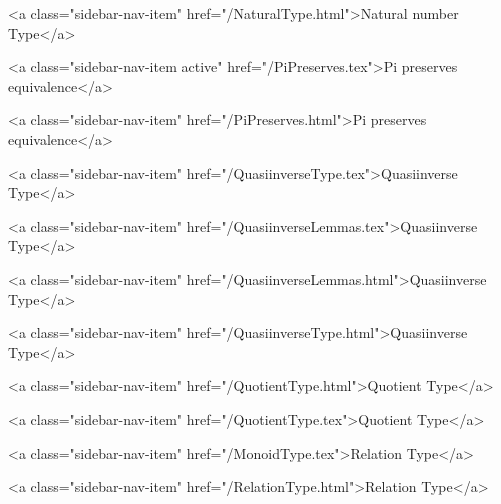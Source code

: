       
        
          <a class="sidebar-nav-item" href="/NaturalType.html">Natural number Type</a>
        
      
    
      
        
          <a class="sidebar-nav-item active" href="/PiPreserves.tex">Pi preserves equivalence</a>
        
      
    
      
        
          <a class="sidebar-nav-item" href="/PiPreserves.html">Pi preserves equivalence</a>
        
      
    
      
        
          <a class="sidebar-nav-item" href="/QuasiinverseType.tex">Quasiinverse Type</a>
        
      
    
      
        
          <a class="sidebar-nav-item" href="/QuasiinverseLemmas.tex">Quasiinverse Type</a>
        
      
    
      
        
          <a class="sidebar-nav-item" href="/QuasiinverseLemmas.html">Quasiinverse Type</a>
        
      
    
      
        
          <a class="sidebar-nav-item" href="/QuasiinverseType.html">Quasiinverse Type</a>
        
      
    
      
        
          <a class="sidebar-nav-item" href="/QuotientType.html">Quotient Type</a>
        
      
    
      
        
          <a class="sidebar-nav-item" href="/QuotientType.tex">Quotient Type</a>
        
      
    
      
        
          <a class="sidebar-nav-item" href="/MonoidType.tex">Relation Type</a>
        
      
    
      
        
          <a class="sidebar-nav-item" href="/RelationType.html">Relation Type</a>
        
